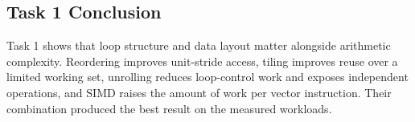 \subsection{Task 1 Conclusion}
Task 1 shows that loop structure and data layout matter alongside arithmetic complexity. Reordering improves unit-stride access, tiling improves reuse over a limited working set, unrolling reduces loop-control work and exposes independent operations, and SIMD raises the amount of work per vector instruction. Their combination produced the best result on the measured workloads.

